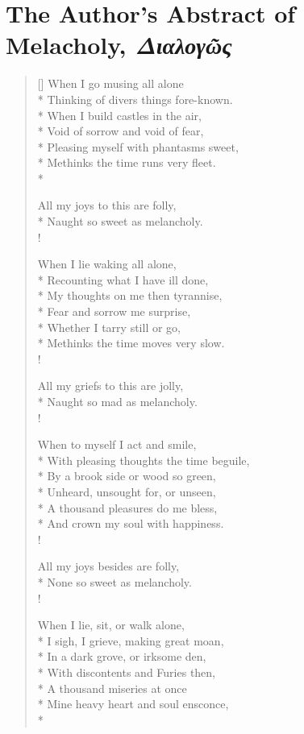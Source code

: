 \chapter{The Author's Abstract of Melacholy, \emph{Διαλογῶς}}
\settowidth{\versewidth}{Here now, then there; the world is mine,}
\begin{verse}[\versewidth]
When I go musing all alone\\*
Thinking of divers things fore-known.\\*
When I build castles in the air,\\*
Void of sorrow and void of fear,\\*
Pleasing myself with phantasms sweet,\\*
Methinks the time runs very fleet.\\*

All my joys to this are folly,\\*
Naught so sweet as melancholy.\\!

When I lie waking all alone,\\*
Recounting what I have ill done,\\*
My thoughts on me then tyrannise,\\*
Fear and sorrow me surprise,\\*
Whether I tarry still or go,\\*
Methinks the time moves very slow.\\!

All my griefs to this are jolly,\\*
Naught so mad as melancholy.\\!

When to myself I act and smile,\\*
With pleasing thoughts the time beguile,\\*
By a brook side or wood so green,\\*
Unheard, unsought for, or unseen,\\*
A thousand pleasures do me bless,\\*
And crown my soul with happiness.\\!

All my joys besides are folly,\\*
None so sweet as melancholy.\\!

When I lie, sit, or walk alone,\\*
I sigh, I grieve, making great moan,\\*
In a dark grove, or irksome den,\\*
With discontents and Furies then,\\*
A thousand miseries at once\\*
Mine heavy heart and soul ensconce,\\*


\end{verse}
